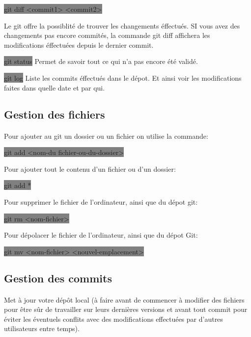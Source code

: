 \documentclass[11pt,a4paper,titlepage, oneside]{article}
\begin{document}
			\colorbox{gray}{git diff <commit1> <commit2>}

			Le git offre la possiblité de trouver les changements éffectués. SI vous avez des changements pas encore commités, la commande git diff affichera les modifications éffectuées depuis le dernier commit.

			\colorbox{gray}{git status} Permet de savoir tout ce qui n'a pas encore été validé.
	
			\colorbox{gray}{git log} Liste les commits éffectués dans le dépot. Et ainsi voir les modifications faites dans quelle date et par qui.

	\subsection{{\color{blue} Gestion des fichiers}}

		\paragraph{}
			Pour ajouter au git un dossier ou un fichier on utilise la commande:

			\colorbox{gray}{git add <nom-du fichier-ou-du-dossier>}

			Pour ajouter tout le contenu d'un fichier ou d'un dossier:

			\colorbox{gray}{git add *}

			Pour supprimer le fichier de l'ordinateur, ainsi que du dépot git:		
			
			\colorbox{gray}{git rm <nom-fichier>}

			Pour dépolacer le fichier de l'ordinateur, ainsi que du dépot Git:
			
			\colorbox{gray}{git mv <nom-fichier> <nouvel-emplacement>}

	\subsection{{\color{blue} Gestion des commits}}

		\paragraph{}
			Met à jour votre dépôt local (à faire avant de commencer à modifier des fichiers pour être sûr de travailler sur leurs dernières versions et avant tout commit pour éviter les éventuels conflits avec des modifications effectuées par d'autres utilisateurs entre temps). 
\end{document}
